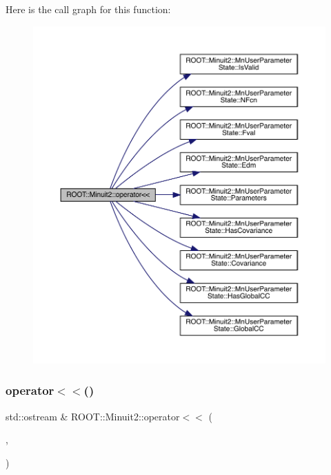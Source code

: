 Here is the call graph for this function\+:\nopagebreak
\begin{figure}[H]
\begin{center}
\leavevmode
\includegraphics[width=350pt]{d6/d3a/namespaceROOT_1_1Minuit2_a30dd5b9978bba19603bb3fb0f7427ddc_cgraph}
\end{center}
\end{figure}
\mbox{\label{namespaceROOT_1_1Minuit2_a490766f2dd62363c6729e716a8da5da8}} 
\subsubsection{\texorpdfstring{operator$<$$<$()}{operator<<()}\hspace{0.1cm}{\footnotesize\ttfamily [9/11]}}
{\footnotesize\ttfamily std\+::ostream \& R\+O\+O\+T\+::\+Minuit2\+::operator$<$$<$ (\begin{DoxyParamCaption}\item[{std\+::ostream \&}]{,  }\item[{const \mbox{\hyperlink{classROOT_1_1Minuit2_1_1MnMachinePrecision}{Mn\+Machine\+Precision}} \&}]{ }\end{DoxyParamCaption})}


